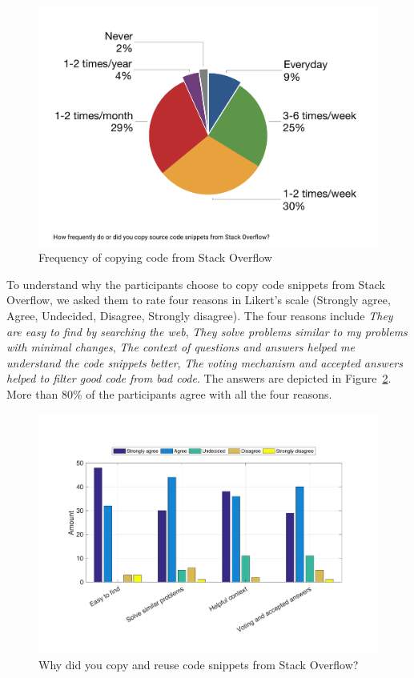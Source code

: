 \documentclass{svjour3}                     %
\begin{document}
\begin{figure} \centering
	\includegraphics[width=.5\linewidth]{survey_visitor_frequency_so_copy} 
	\caption{Frequency of copying code from Stack Overflow}
	\label{fig:survey_visitor_frequency_so_copy-crop} 
\end{figure}

To understand why the participants choose to copy code snippets from Stack
Overflow, we asked them to rate four reasons in Likert's scale (Strongly agree,
Agree, Undecided, Disagree, Strongly disagree). The four reasons include
\textit{They are easy to find by searching the web}, \textit{They solve problems
	similar to my problems with minimal changes}, \textit{The context of questions
	and answers helped me understand the code snippets better}, \textit{The voting
	mechanism and accepted answers helped to filter good code from bad code}. The
answers are depicted in Figure~\ref{fig:survey_visitor_why_copy_so}. More than 80\% of the
participants agree with all the four reasons. 

\begin{figure} \centering
	\includegraphics[width=0.6\linewidth]{survey_visitor_why_copy_so} 
	\caption{Why did you copy and reuse code snippets from Stack Overflow?}
	\label{fig:survey_visitor_why_copy_so} 
\end{figure}

\vspace{0.5cm} \noindent{} \vspace{0.5cm}
\end{document}
